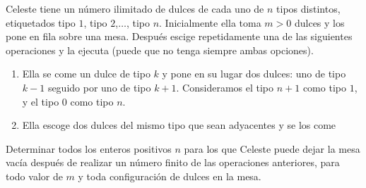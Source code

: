 Celeste tiene un número ilimitado de dulces de cada uno de $n$ tipos distintos, etiquetados tipo $1$, tipo $2$,$\dots$, tipo $n$. Inicialmente ella toma $m\gt 0$ dulces y los pone en fila sobre una mesa. Después escige repetidamente una de las siguientes operaciones y la ejecuta (puede que no tenga siempre ambas opciones).
 \begin{enumerate} 
 \item  Ella se come un dulce de tipo $k$ y pone en su lugar dos dulces: uno de tipo $k-1$ seguido por uno de tipo $k+1$. Consideramos el tipo $n+1$ como tipo $1$, y el tipo $0$ como tipo $n$.
 \item  Ella escoge dos dulces del mismo tipo que sean adyacentes y se los come 
 \end{enumerate} 
Determinar todos los enteros positivos $n$ para los que Celeste puede dejar la mesa vacía después de realizar un número finito de las operaciones anteriores, para todo valor de $m$ y toda configuración de dulces en la mesa.